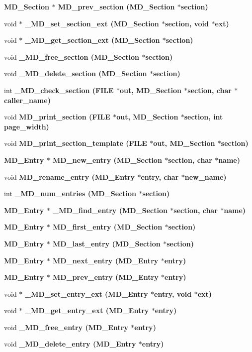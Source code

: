 \begin{CompactItemize}
\bf{MD\_\-Section} $\ast$ \bf{MD\_\-prev\_\-section} (\bf{MD\_\-Section} $\ast$section)
\item 
void $\ast$ \bf{\_\-MD\_\-set\_\-section\_\-ext} (\bf{MD\_\-Section} $\ast$section, void $\ast$ext)
\item 
void $\ast$ \bf{\_\-MD\_\-get\_\-section\_\-ext} (\bf{MD\_\-Section} $\ast$section)
\item 
void \bf{\_\-MD\_\-free\_\-section} (\bf{MD\_\-Section} $\ast$section)
\item 
void \bf{\_\-MD\_\-delete\_\-section} (\bf{MD\_\-Section} $\ast$section)
\item 
int \bf{\_\-MD\_\-check\_\-section} (FILE $\ast$out, \bf{MD\_\-Section} $\ast$section, char $\ast$caller\_\-name)
\item 
void \bf{MD\_\-print\_\-section} (FILE $\ast$out, \bf{MD\_\-Section} $\ast$section, int page\_\-width)
\item 
void \bf{MD\_\-print\_\-section\_\-template} (FILE $\ast$out, \bf{MD\_\-Section} $\ast$section)
\item 
\bf{MD\_\-Entry} $\ast$ \bf{MD\_\-new\_\-entry} (\bf{MD\_\-Section} $\ast$section, char $\ast$\bf{name})
\item 
void \bf{MD\_\-rename\_\-entry} (\bf{MD\_\-Entry} $\ast$\bf{entry}, char $\ast$new\_\-name)
\item 
int \bf{\_\-MD\_\-num\_\-entries} (\bf{MD\_\-Section} $\ast$section)
\item 
\bf{MD\_\-Entry} $\ast$ \bf{\_\-MD\_\-find\_\-entry} (\bf{MD\_\-Section} $\ast$section, char $\ast$\bf{name})
\item 
\bf{MD\_\-Entry} $\ast$ \bf{MD\_\-first\_\-entry} (\bf{MD\_\-Section} $\ast$section)
\item 
\bf{MD\_\-Entry} $\ast$ \bf{MD\_\-last\_\-entry} (\bf{MD\_\-Section} $\ast$section)
\item 
\bf{MD\_\-Entry} $\ast$ \bf{MD\_\-next\_\-entry} (\bf{MD\_\-Entry} $\ast$\bf{entry})
\item 
\bf{MD\_\-Entry} $\ast$ \bf{MD\_\-prev\_\-entry} (\bf{MD\_\-Entry} $\ast$\bf{entry})
\item 
void $\ast$ \bf{\_\-MD\_\-set\_\-entry\_\-ext} (\bf{MD\_\-Entry} $\ast$\bf{entry}, void $\ast$ext)
\item 
void $\ast$ \bf{\_\-MD\_\-get\_\-entry\_\-ext} (\bf{MD\_\-Entry} $\ast$\bf{entry})
\item 
void \bf{\_\-MD\_\-free\_\-entry} (\bf{MD\_\-Entry} $\ast$\bf{entry})
\item 
void \bf{\_\-MD\_\-delete\_\-entry} (\bf{MD\_\-Entry} $\ast$\bf{entry})

\end{CompactItemize}
